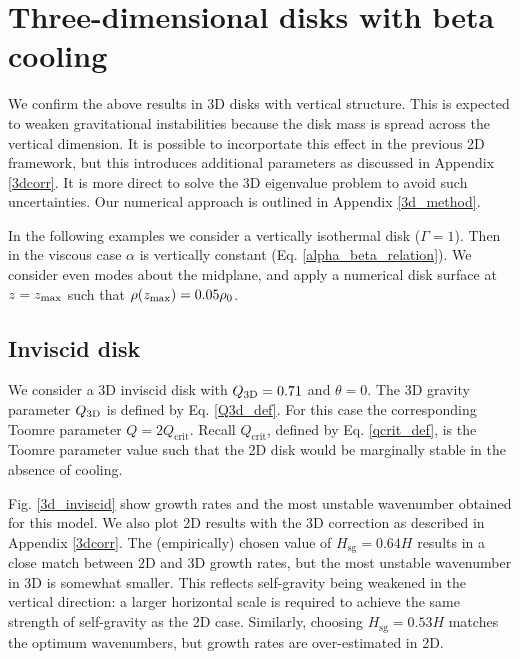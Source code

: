 \section{Three-dimensional disks with beta cooling}\label{3ddisk}
We confirm the above results in 3D disks with vertical
structure. This is expected to weaken gravitational instabilities
because the disk mass is spread across the vertical dimension. It is
possible to incorportate this effect in the previous 2D framework, but this
introduces additional parameters as discussed in Appendix
\ref{3dcorr}. It is more direct to solve the 3D eigenvalue problem to
avoid such uncertainties. Our numerical approach is outlined in Appendix
\ref{3d_method}. 


In the following examples we consider a vertically isothermal disk
($\Gamma=1$). Then in the viscous case $\alpha$ is vertically
constant (Eq. \ref{alpha_beta_relation}). We consider even modes about
the midplane, and apply a numerical disk surface at $z=z_\mathrm{max}$ such
that $\rho(z_\mathrm{max})=0.05\rho_0$.    

\subsection{Inviscid disk}

We consider a 3D inviscid disk with $Q_\mathrm{3D}=0.71$ and $\theta=0$. 
The 3D gravity parameter $Q_\mathrm{3D}$ is defined by 
Eq. \ref{Q3d_def}. For this case the corresponding Toomre parameter 
$Q=2Q_\mathrm{crit}$. Recall $Q_\mathrm{crit}$, defined by
Eq. \ref{qcrit_def}, is the Toomre parameter value such that the 2D
disk would be marginally stable in the absence of cooling. 

Fig. \ref{3d_inviscid} show growth rates and the most unstable
wavenumber obtained for this model. We also plot 2D
results with the 3D correction as described in Appendix
\ref{3dcorr}. The (empirically) chosen value of
$H_\mathrm{sg}=0.64H$ results in a close match between 2D and 3D
growth rates, but the most unstable wavenumber in 3D is somewhat smaller. 
This reflects self-gravity being weakened in the vertical 
direction: a larger horizontal scale is required to achieve the same
strength of self-gravity as the 2D case. Similarly, 
choosing $H_\mathrm{sg}=0.53H$ matches the optimum wavenumbers, but
growth rates are over-estimated in 2D.    

